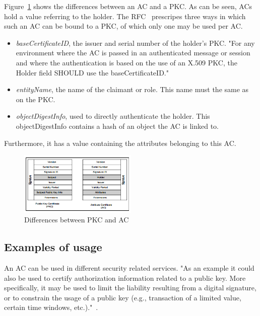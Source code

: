 \documentclass[10pt,conference,a4paper]{IEEEtran}
\begin{document}
 Figure~\ref{fig:diff} shows the differences between an AC and a PKC. As can be seen, ACs hold a value referring to the holder. The RFC~\cite{rfc_ac} prescripes three ways in which such an AC can be bound to a PKC, of which only one may be used per AC.
\begin{itemize}
	\item \textit{baseCertificateID}, the issuer and serial number of the holder's PKC. "For any environment where the AC is passed in an authenticated message or session and where the authentication is based on the use of an X.509 PKC, the Holder field SHOULD use the baseCertificateID."~\cite{rfc_ac}
	\item \textit{entityName}, the name of the claimant or role. This name must the same as on the PKC.
	\item \textit{objectDigestInfo}, used to directly authenticate the holder. This objectDigestInfo contains a hash of an object the AC is linked to.
\end{itemize}
Furthermore, it has a value containing the attributes belonging to this AC.

\begin{figure}[h]
	\centering
	\includegraphics[width=0.5\textwidth]{diff.png}
	\caption{Differences between PKC and AC~\cite{godavari2001secure}}
	\label{fig:diff}
\end{figure}

\subsection{Examples of usage}
An AC can be used in different security related services. "As an example it could also be used to certify authorization information related to a public key. More specifically, it may be used to limit the liability resulting from a digital signature, or to constrain the usage of a public key (e.g., transaction of a limited value, certain time windows, etc.)."~\cite{tilborg2011encyclopedia}.
\end{document}
